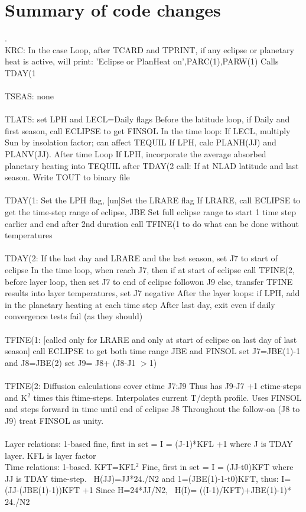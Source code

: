 \documentclass{article}
\begin{document}
\section{Summary of code changes}

. \\
KRC:
\qi  In the case Loop, after TCARD and TPRINT, if any eclipse or planetary heat 
  is active, will print:  'Eclipse or PlanHeat on',PARC(1),PARW(1)
\qi   Calls TDAY(1
\\ \\
TSEAS:  none
\\ \\
TLATS:
\qi   [un]set LPH and LECL=Daily flags
\qi   Before the latitude loop, if Daily and first season, call ECLIPSE to get FINSOL
\qi   In the time loop:
\qii      If LECL,  multiply Sun by insolation factor; can affect TEQUIL
\qii      If LPH, calc PLANH(JJ) and PLANV(JJ).
\qi   After time Loop
\qii      If LPH, incorporate the average absorbed planetary heating into TEQUIL
\qi after TDAY(2 call: If at NLAD latitude and last season. Write TOUT to binary file
\\ \\
TDAY(1:
\qi    [un]Set the LPH flag, [un]Set the LRARE flag
\qi    If LRARE, 
\qii    call ECLIPSE to get the time-step range of eclipse, JBE
\qii    Set full eclipse range to start 1 time step earlier and end after 2nd duration
\qii    call TFINE(1 to do what can be done without temperatures
\\ \\
TDAY(2:
 \qi  If the last day and LRARE and the last season, set J7 to start of eclipse
 \qi  In the time loop, when reach J7, then 
 \qii  if at start of eclipse call TFINE(2, before layer loop, then set J7 to end of eclipse followon J9
    else, transfer TFINE results into layer temperatures, set J7 negative
\qi After the layer loops: if LPH, add in the planetary heating at each time step
\qi After last day, exit even if daily convergence tests fail (as they should) 
\\ \\
TFINE(1: [called only for LRARE and only at start of eclipse on last day of last season] 
\qi  call ECLIPSE to get both time range JBE and FINSOL
\qi  set J7=JBE(1)-1 and J8=JBE(2)
\qi  set J9= J8+ (J8-J1 $>$1) 
\\ \\
TFINE(2:  Diffusion calculations cover ctime J7:J9 
\qii Thus has J9-J7 +1 ctime-steps and K$^2$ times this ftime-steps.
\qi  Interpolates current T/depth profile.
\qi Uses FINSOL and steps forward in time until end of eclipse J8
\qi  Throughout the follow-on (J8 to J9) treat FINSOL as unity. 
\\ \\
Layer relations: 1-based
\qi  fine, first in set = I = (J-1)*KFL +1 where J is TDAY layer. KFL is layer factor
\\ 
Time relations: 1-based.  KFT=KFL$^2$
\qi  Fine, first in set = I = (JJ-t0)KFT where JJ is TDAY time-step. \ H(JJ)=JJ*24./N2
\qii    and 1=(JBE(1)-1-t0)KFT, thus:   I=(JJ-(JBE(1)-1))KFT +1
\qi  Since H=24*JJ/N2, \ H(I)= ((I-1)/KFT)+JBE(1)-1)* 24./N2
\end{document}
